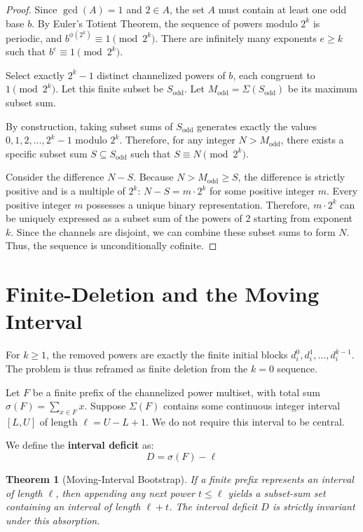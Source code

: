 \documentclass[12pt,reqno]{amsart}
\newtheorem{theorem}{Theorem}[section]
\theoremstyle{definition}
\begin{document}
\begin{proof}
Since $\gcd(A) = 1$ and $2 \in A$, the set $A$ must contain at least one odd base $b$. By Euler's Totient Theorem, the sequence of powers modulo $2^k$ is periodic, and $b^{\phi(2^k)} \equiv 1 \pmod{2^k}$. There are infinitely many exponents $e \ge k$ such that $b^e \equiv 1 \pmod{2^k}$.

Select exactly $2^k - 1$ distinct channelized powers of $b$, each congruent to $1 \pmod{2^k}$. Let this finite subset be $S_{\text{odd}}$. Let $M_{\text{odd}} = \Sigma(S_{\text{odd}})$ be its maximum subset sum. 

By construction, taking subset sums of $S_{\text{odd}}$ generates exactly the values $0, 1, 2, \dots, 2^k - 1$ modulo $2^k$. Therefore, for any integer $N > M_{\text{odd}}$, there exists a specific subset sum $S \subseteq S_{\text{odd}}$ such that $S \equiv N \pmod{2^k}$. 

Consider the difference $N - S$. Because $N > M_{\text{odd}} \ge S$, the difference is strictly positive and is a multiple of $2^k$: $N - S = m \cdot 2^k$ for some positive integer $m$. Every positive integer $m$ possesses a unique binary representation. Therefore, $m \cdot 2^k$ can be uniquely expressed as a subset sum of the powers of 2 starting from exponent $k$. Since the channels are disjoint, we can combine these subset sums to form $N$. Thus, the sequence is unconditionally cofinite.
\end{proof}

\section{Finite-Deletion and the Moving Interval}

For $k \ge 1$, the removed powers are exactly the finite initial blocks $d_i^0, d_i^1, \dots, d_i^{k-1}$. The problem is thus reframed as finite deletion from the $k=0$ sequence.

Let $F$ be a finite prefix of the channelized power multiset, with total sum $\sigma(F) = \sum_{x \in F} x$. Suppose $\Sigma(F)$ contains some continuous integer interval $[L, U]$ of length $\ell = U - L + 1$. We do not require this interval to be central.

We define the \textbf{interval deficit} as:
\[ D = \sigma(F) - \ell \]

\begin{theorem}[Moving-Interval Bootstrap]
If a finite prefix represents an interval of length $\ell$, then appending any next power $t \le \ell$ yields a subset-sum set containing an interval of length $\ell + t$. The interval deficit $D$ is strictly invariant under this absorption.
\end{theorem}
\end{document}
